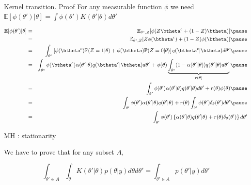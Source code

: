  \begin{frame}{Kernel transition. Proof} 
 For any measurable function $\phi$ we need $\mathbb{E}[\phi(\theta') | \theta]  = \int \phi(\theta')K(\theta' | \theta) d\theta'$

{\small 
\begin{eqnarray*}
 \mathbb{E}[\phi(\theta') | \theta]  &=&    \mathbb{E}_{\theta^c,Z}[\phi(Z \btheta^c    + (1-Z)  \btheta)] \pause \\ 
 &=&    \mathbb{E}_{\theta^c,Z}[Z \phi(\btheta^c)    + (1-Z)  \phi(\btheta)] \pause\\
&=& \int_{\theta^c} \left[\phi(\btheta^c)\mathbb{P}(Z = 1 | \theta) +  \phi(\btheta) \mathbb{P}(Z = 0 | \theta)\right] q(\btheta^c | \btheta) d \theta^c \pause \\ 
 &=&  \int_{\theta^c}  \phi(\btheta^c)\alpha(\theta^c | \theta) q(\btheta^c | \btheta) d \theta^c  + \phi(\theta)\underbrace{ \int_{\theta^c} (1-\alpha(\theta^c | \theta)) q (\theta^c | \theta) d \theta^c}_{r(\theta)} \pause\\
 &=& \int_{\theta'} \phi(\theta') \alpha(\theta' | \theta) q(\theta'|\theta)d\theta'  + r(\theta) \phi(\theta) \pause \\
&=&  \int_{\theta'} \phi(\theta')    \alpha(\theta' | \theta) q(\theta'|\theta)  + r(\theta) \int_{\theta'} \phi(\theta') \delta_{\theta}(\theta')  d\theta' \pause \\
&=&  \int_{\theta'} \phi(\theta')  \left\{ \alpha(\theta' | \theta) q(\theta'|\theta)  + r(\theta) \delta_{\theta}(\theta')\right\} d\theta'   
\end{eqnarray*}
 }



\end{frame}

\begin{frame}{MH : stationarity}


We have to prove that  for any subset $A$, 

$$ \int_{\theta' \in A}\int_{\theta} K(\theta' | \theta) p(\theta|y) d\theta d\theta'= \int_{\theta' \in A} p(\theta' | y) d\theta'$$
 
 
 
\end{frame}
 
 

